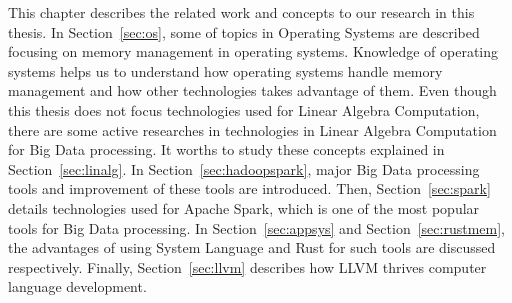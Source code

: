 This chapter describes the related work and concepts to our research in this thesis. 
In Section~\ref{sec:os}, some of topics in Operating Systems are described focusing on memory management in operating systems.
Knowledge of operating systems helps us to understand how operating systems handle memory management and 
how other technologies takes advantage of them. Even though this thesis does not focus technologies used for Linear Algebra Computation, 
there are some active researches in technologies in Linear Algebra Computation for Big Data processing. 
It worths to study these concepts explained in Section~\ref{sec:linalg}. 
In Section~\ref{sec:hadoopspark}, major Big Data processing tools and improvement of these tools are introduced. 
Then, Section~\ref{sec:spark} details technologies used for Apache Spark, which is one of the most popular tools for Big Data processing.
In Section~\ref{sec:appsys} and Section~\ref{sec:rustmem}, the advantages of using System Language and Rust for such tools are discussed respectively.
Finally, Section~\ref{sec:llvm} describes how LLVM thrives computer language development. 


